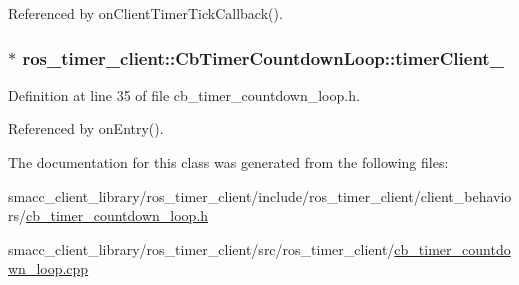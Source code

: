 Referenced by on\+Client\+Timer\+Tick\+Callback().

\subsubsection[{\texorpdfstring{timer\+Client\+\_\+}{timerClient_}}]{$\ast$ ros\+\_\+timer\+\_\+client\+::\+Cb\+Timer\+Countdown\+Loop\+::timer\+Client\+\_\+\hspace{0.3cm}{\ttfamily [private]}}\hypertarget{classros__timer__client_1_1CbTimerCountdownLoop_a71e00f5443da2a1422a58c68a5e940a4}{}\label{classros__timer__client_1_1CbTimerCountdownLoop_a71e00f5443da2a1422a58c68a5e940a4}


Definition at line 35 of file cb\+\_\+timer\+\_\+countdown\+\_\+loop.\+h.



Referenced by on\+Entry().



The documentation for this class was generated from the following files\+:\begin{DoxyCompactItemize}
\item 
smacc\+\_\+client\+\_\+library/ros\+\_\+timer\+\_\+client/include/ros\+\_\+timer\+\_\+client/client\+\_\+behaviors/\hyperlink{cb__timer__countdown__loop_8h}{cb\+\_\+timer\+\_\+countdown\+\_\+loop.\+h}\item 
smacc\+\_\+client\+\_\+library/ros\+\_\+timer\+\_\+client/src/ros\+\_\+timer\+\_\+client/\hyperlink{cb__timer__countdown__loop_8cpp}{cb\+\_\+timer\+\_\+countdown\+\_\+loop.\+cpp}\end{DoxyCompactItemize}
